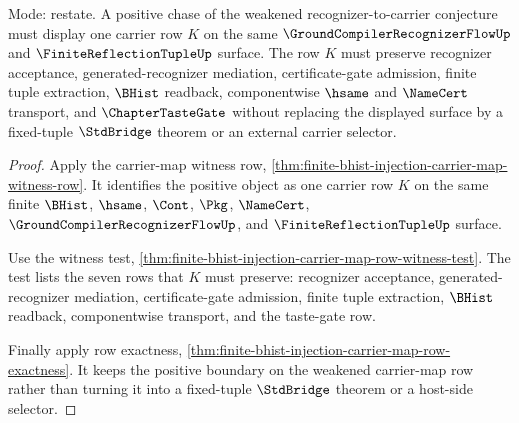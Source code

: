 \begin{theorem}
\label{thm:finite-bhist-injection-carrier-row-positive-boundary}
Mode: restate. A positive chase of the weakened recognizer-to-carrier conjecture must display one carrier row $K$ on the same $\GroundCompilerRecognizerFlowUp$ and $\FiniteReflectionTupleUp$ surface. The row $K$ must preserve recognizer acceptance, generated-recognizer mediation, certificate-gate admission, finite tuple extraction, $\BHist$ readback, componentwise $\hsame$ and $\NameCert$ transport, and $\ChapterTasteGate$ without replacing the displayed surface by a fixed-tuple $\StdBridge$ theorem or an external carrier selector.
\end{theorem}
\begin{proof}
Apply the carrier-map witness row, \autoref{thm:finite-bhist-injection-carrier-map-witness-row}. It identifies the positive object as one carrier row $K$ on the same finite $\BHist$, $\hsame$, $\Cont$, $\Pkg$, $\NameCert$, $\GroundCompilerRecognizerFlowUp$, and $\FiniteReflectionTupleUp$ surface.

Use the witness test, \autoref{thm:finite-bhist-injection-carrier-map-row-witness-test}. The test lists the seven rows that $K$ must preserve: recognizer acceptance, generated-recognizer mediation, certificate-gate admission, finite tuple extraction, $\BHist$ readback, componentwise transport, and the taste-gate row.

Finally apply row exactness, \autoref{thm:finite-bhist-injection-carrier-map-row-exactness}. It keeps the positive boundary on the weakened carrier-map row rather than turning it into a fixed-tuple $\StdBridge$ theorem or a host-side selector.
\end{proof}

